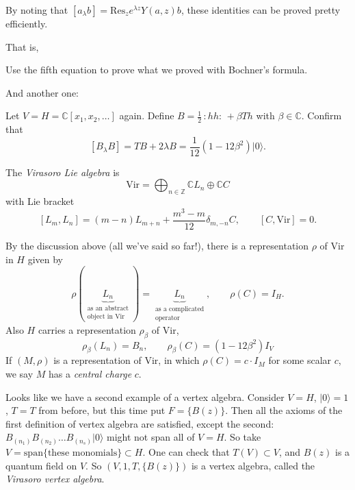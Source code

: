 \begin{remark}
\label{remark-how-to-use}
By noting that $[a_\lambda
b]=\text{Res}_ze^{\lambda z}Y(a,z)b$,
these identities can be proved pretty
efficiently.
\end{remark}

That is,

\begin{exercise}
\label{exercise-use-the-5th}
Use the fifth equation to prove what we
proved with Bochner's formula.
\end{exercise}

And another one:

\begin{exercise}
\label{exercise-}
Let $V=H=\mathbb{C}[x_1,x_2,\ldots]$ again.
Define $B=\frac{1}{2}\,:\!h h\!:\,+\beta Th$
with $\beta \in \mathbb{C}$.
Confirm that
$$
[B_\lambda B]=TB+2\lambda
B=\frac{1}{12}(1-12\beta^2)|0\rangle.
$$
\end{exercise}

\begin{definition}
\label{definition-Virasoro-Lie-algebra}
The {\it Virasoro Lie algebra} is
$$
\text{Vir}=\bigoplus_{n \in
\mathbb{Z}}\mathbb{C}L_n \oplus \mathbb{C}C
$$
with Lie bracket
$$
[L_m,L_n]=(m-n)L_{m+n}+\frac{m^3-m}{12}
\delta_{m,-n}C,\qquad
[C,\text{Vir}]=0.
$$
\end{definition}
By the discussion above (all we've said so
far!),
there is a representation $\rho$ of
$\text{Vir}$ in $H$
given by
$$
\rho(\underbrace{L_n}_{\substack{\text{as an
abstract} \\
\text{object in Vir}}})
=\underbrace{L_n}_{\substack{\text{as a
complicated} \\ \text{operator}}},
\qquad \rho(C)=I_H.
$$
Also $H$ carries a representation
$\rho_\beta$ of $\text{Vir}$,
$$
\rho_\beta(L_n)=B_n,\qquad
\rho_\beta(C)=(1-12\beta^2)I_V
$$
If $(M,\rho)$ is a representation of
$\text{Vir}$, in which
 $\rho(C)=c\cdot I_M$ for some scalar $c$, we
 say $M$ has a
{\it central charge} $c$.

Looks like we have a second example of a
vertex algebra.
Consider $V=H$, $|0\rangle=1$, $T=T$ from
before, but this time put
$F=\{B(z)\}$. Then all the axioms of the
first definition of vertex
algebra are satisfied, except the second:
$B_{(n_1)}B_{(n_2)}\ldots B_{(n_s)}|0\rangle$
might not span all of $V=H$.
So take $V=\text{span}\{\text{these
monomials}\}\subset H$.
One can check that $T(V) \subset V$, and
$B(z)$ is a quantum field on $V$.
So $(V,1,T,\{B(z)\})$ is a vertex algebra,
called the
{\it Virasoro vertex algebra}.

